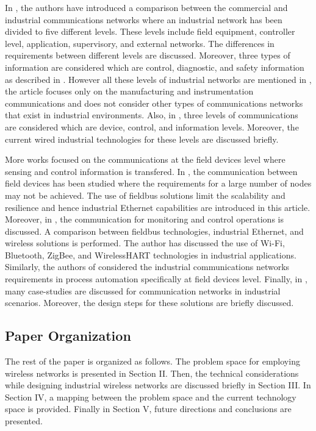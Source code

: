 In \cite{6248648}, the authors have introduced a comparison between the commercial and industrial communications networks where an industrial network has been divided to five different levels. These levels include field equipment, controller level, application, supervisory, and external networks. The differences in requirements between different levels are discussed. Moreover, three types of information are considered which are control, diagnostic, and safety information as described in \cite{4118467}. However all these levels of industrial networks are mentioned in \cite{6248648}, the article focuses only on the manufacturing and instrumentation communications and does not consider other types of communications networks that exist in industrial environments. Also, in \cite{What}, three levels of communications are considered which are device, control, and information levels. Moreover, the current wired industrial technologies for these levels are discussed briefly.

More works focused on the communications at the field devices level where sensing and control information is transfered. In \cite{7005074},  the communication between field devices has been studied where the requirements for a large number of nodes may not be achieved. The use of fieldbus solutions limit the scalability and resilience and hence industrial Ethernet capabilities are introduced in this article. Moreover, in \cite{Connectivity}, the communication for monitoring and control operations is discussed. A comparison between fieldbus technologies, industrial Ethernet, and wireless solutions is performed. The author has discussed the use of Wi-Fi, Bluetooth, ZigBee, and WirelessHART technologies in industrial applications. Similarly, the authors of \cite{6490786} considered the industrial communications networks requirements in process automation specifically at field devices level. Finally, in \cite{GE_Professional}, many case-studies are discussed for communication networks in industrial scenarios. Moreover, the design steps for these solutions are briefly discussed.

    \subsection{Paper Organization}
    The rest of the paper is organized as follows. The problem space for employing wireless networks is presented in Section II. Then, the technical considerations while designing industrial wireless networks are discussed briefly in Section III.  In Section IV, a mapping between the problem space and the current technology space is provided. Finally in Section V, future directions and conclusions are presented.
    

